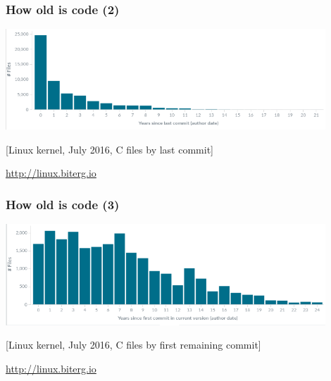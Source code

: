 \documentclass[17pt,aspectratio=169,hyperref=pdfusetitle]{beamer}
\begin{document}
\begin{frame}
\frametitle{How old is code (2)}

\begin{center}
  \includegraphics[width=12cm]{figs/linux-files-age}
\end{center}

{\Large
[Linux kernel, July 2016, C files by last commit]
}

\begin{flushright}
  \url{http://linux.biterg.io}
\end{flushright}
\end{frame}

\begin{frame}
\frametitle{How old is code (3)}

\begin{center}
  \includegraphics[width=12cm]{figs/linux-files-first-edit-c}
\end{center}

{\Large
[Linux kernel, July 2016, C files by first remaining commit]
}

\begin{flushright}
  \url{http://linux.biterg.io}
\end{flushright}
\end{frame}
\end{document}
